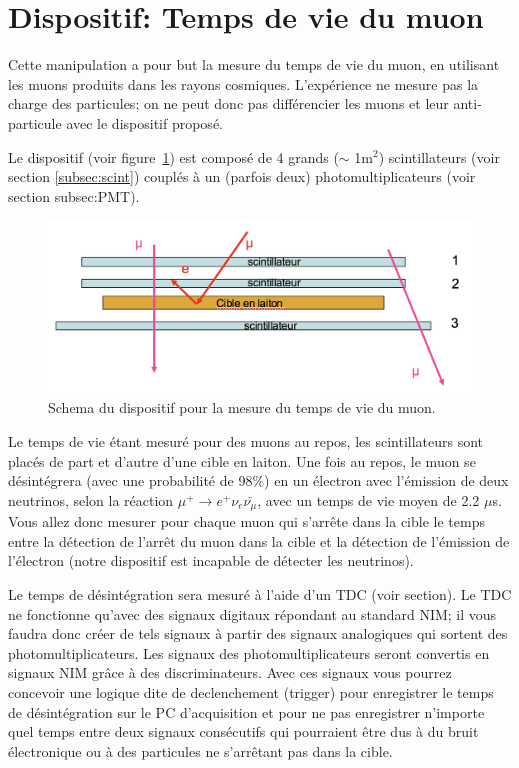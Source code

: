 \section{Dispositif: Temps de vie du muon}
Cette manipulation a pour but la mesure du temps de vie du muon, en utilisant
les muons produits dans les rayons cosmiques. L'exp\'erience ne mesure pas la
charge des particules; on ne peut donc pas diff\'erencier les muons et
leur anti-particule avec le dispositif propos\'e.

Le dispositif (voir figure~\ref{fig:TpsVieMuon_disp}) est compos\'e de 4 grands ($\sim$ 1m$^2$) scintillateurs (voir section
\ref{subsec:scint}) coupl\'es \`a un (parfois deux) photomultiplicateurs (voir section subsec:PMT).

\begin{figure}[!h]
    \centering
	\includegraphics[width=\textwidth]{figures/Schema-Tps-de-vie.png}
    \caption{Schema du dispositif pour la mesure du temps de vie du muon.}
    \label{fig:TpsVieMuon_disp} 
\end{figure}

Le temps de vie \'etant mesur\'e pour des muons au repos, les scintillateurs sont plac\'es de part et d'autre d'une cible en laiton.
Une fois au repos, le muon se d\'esint\'egrera (avec une probabilit\'e de 98$\%$) en un
\'electron avec l'\'emission de deux neutrinos, selon la r\'eaction
$\mu^+ \rightarrow e^+ \nu_e \bar{\nu_{\mu}}$, avec un temps de vie moyen de 2.2 $\mu$s.
Vous allez donc mesurer pour chaque muon qui s'arr\^ete dans la cible le temps
entre la d\'etection de l'arr\^et du muon dans la cible et la d\'etection de
l'\'emission de l'\'electron (notre dispositif est incapable de d\'etecter
les neutrinos).

Le temps de d\'esint\'egration sera mesur\'e \`a l'aide d'un TDC (voir section).
Le TDC ne fonctionne qu'avec des signaux digitaux répondant au standard NIM;
il vous faudra donc cr\'eer de tels signaux \`a  partir des signaux analogiques
qui sortent des photomultiplicateurs. Les signaux des photomultiplicateurs seront convertis en signaux NIM grâce à des discriminateurs. Avec ces signaux vous
pourrez concevoir une logique dite de declenchement (trigger) pour enregistrer
le temps de d\'esint\'egration sur le PC d'acquisition et pour ne pas
enregistrer n'importe quel temps entre deux signaux consécutifs qui pourraient
\^etre dus \`a du bruit \'electronique ou \`a des particules ne s'arr\^etant pas dans la cible.

